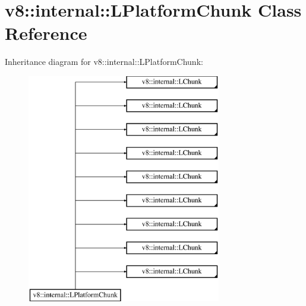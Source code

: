 \hypertarget{classv8_1_1internal_1_1_l_platform_chunk}{}\section{v8\+:\+:internal\+:\+:L\+Platform\+Chunk Class Reference}
\label{classv8_1_1internal_1_1_l_platform_chunk}
Inheritance diagram for v8\+:\+:internal\+:\+:L\+Platform\+Chunk\+:\begin{figure}[H]
\begin{center}
\leavevmode
\includegraphics[height=10.000000cm]{classv8_1_1internal_1_1_l_platform_chunk}
\end{center}
\end{figure}
